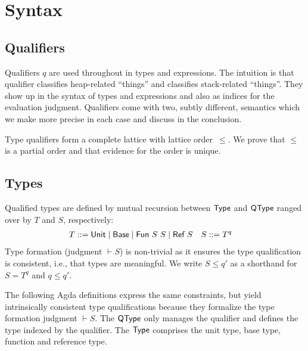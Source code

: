 \documentclass[sigplan,dvipsnames,screen]{acmart}
\begin{document}
\section{Syntax}
\label{sec:syntax}

\subsection{Qualifiers}
\label{sec:qualifiers}

Qualifiers $q$ are used throughout in types and
expressions. The intuition is that qualifier {\AOne} classifies heap-related ``things'' and {\ATwo} classifies
stack-related ``things''.  They show up in the syntax of
types and expressions and also as indices for the evaluation
judgment. Qualifiers come with two, subtly different, semantics which
we make more precise in each case and discuss in the conclusion.
\Qual

Type qualifiers form a complete lattice with lattice order~$\le$. We
prove that $\le$ is a partial order and that evidence for the order is unique.

\subsection{Types}
\label{sec:types}



Qualified types are defined by mutual recursion between $\AType$ and
$\AQType$ ranged over by $T$ and $S$, respectively:
\begin{align*}
  T &::= \ACUnit \mid \ACBase \mid \ACFun~S~S \mid \ACRef~S & S & ::= T^q
\end{align*}
Type formation (judgment $\vdash S$) is non-trivial as it ensures the
type qualification is consistent, i.e.,
that types are meaningful. We write $S\le q'$ as a shorthand for
$S=T^q$ and $q\le q'$.
The following Agda definitions express the same constraints, but
yield intrinsically consistent type qualifications because they formalize the type
formation judgment $\vdash S$. 
\QType
The $\AQType$ only manages the qualifier and defines the type indexed
by the qualifier. The $\AType$ comprises the unit type, base type,
function and reference type.
\end{document}
